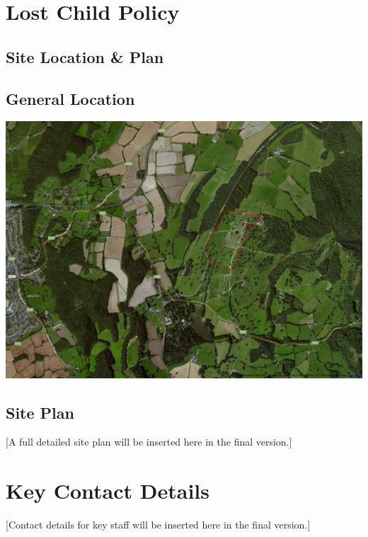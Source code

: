 \section{Lost Child Policy}
\label{lost-child-policy}

\pagestyle{empty}
\begin{landscape}
\section{Site Location \& Plan}
\label{site-plan}
\subsection{General Location}
\includegraphics[width=23cm]{./supplementary/wide-map.png}
\end{landscape}
\subsection{Site Plan}
[A full detailed site plan will be inserted here in the final version.]
\newpage
\section{Key Contact Details}
\label{key-contact}
[Contact details for key staff will be inserted here in the final version.]

